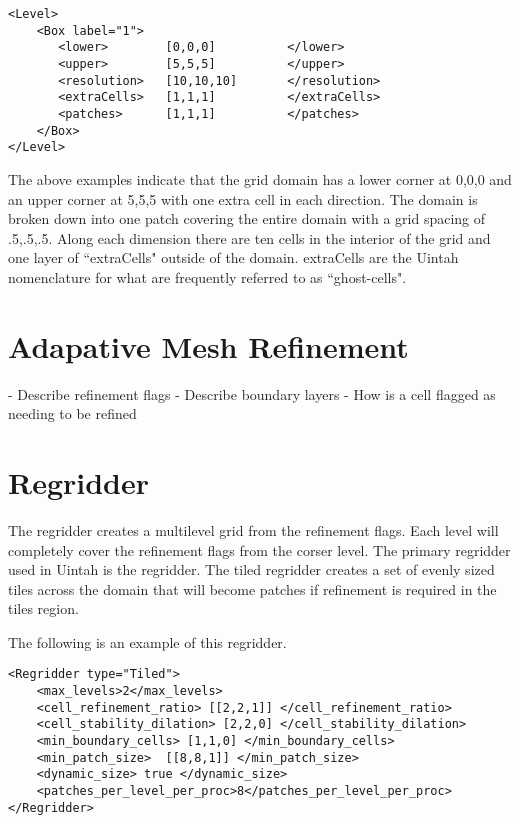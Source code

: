 \begin{Verbatim}[fontsize=\footnotesize]
<Level>
    <Box label="1">
       <lower>        [0,0,0]          </lower>
       <upper>        [5,5,5]          </upper>
       <resolution>   [10,10,10]       </resolution>
       <extraCells>   [1,1,1]          </extraCells>
       <patches>      [1,1,1]          </patches>
    </Box>
</Level>
\end{Verbatim}


The above examples indicate that the grid domain has a lower corner at
0,0,0 and an upper corner at 5,5,5 with one extra cell in each
direction.  The domain is broken down into one patch covering the
entire domain with a grid spacing of .5,.5,.5.  Along each dimension
there are ten cells in the interior of the grid and one layer of
``extraCells" outside of the domain.  extraCells are the Uintah nomenclature
for what are frequently referred to as ``ghost-cells".

%
\section{Adapative Mesh Refinement}
- Describe refinement flags
- Describe boundary layers
- How is a cell flagged as needing to be refined
%
\section{Regridder}

The regridder creates a multilevel grid from the refinement flags.
Each level will completely cover the refinement flags from the corser
level.  The primary regridder used in Uintah is the  regridder.
The tiled regridder creates a set of evenly sized tiles across the domain
that will become patches if refinement is required in the tiles region.

The following is an example of this regridder.

\begin{Verbatim}[fontsize=\footnotesize]
<Regridder type="Tiled">   
    <max_levels>2</max_levels>
    <cell_refinement_ratio> [[2,2,1]] </cell_refinement_ratio>
    <cell_stability_dilation> [2,2,0] </cell_stability_dilation>
    <min_boundary_cells> [1,1,0] </min_boundary_cells>
    <min_patch_size>  [[8,8,1]] </min_patch_size>
    <dynamic_size> true </dynamic_size>      
    <patches_per_level_per_proc>8</patches_per_level_per_proc>   
</Regridder>
\end{Verbatim}

